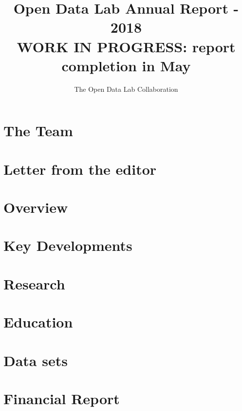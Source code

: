 \documentclass[12pt,letterpaper]{report} %
\title{Open Data Lab Annual Report - 2018\\
\large WORK IN PROGRESS: report completion in May }
\author{The Open Data Lab Collaboration}
\begin{document}
\maketitle

\chapter*{The Team}   %

\chapter*{Letter from the editor}   %

\tableofcontents
\pagebreak

\chapter{Overview} 

\chapter{Key Developments} 

\chapter{Research} 

\chapter{Education} 

\chapter{Data sets} 

\chapter{Financial Report} 

\end{document}
